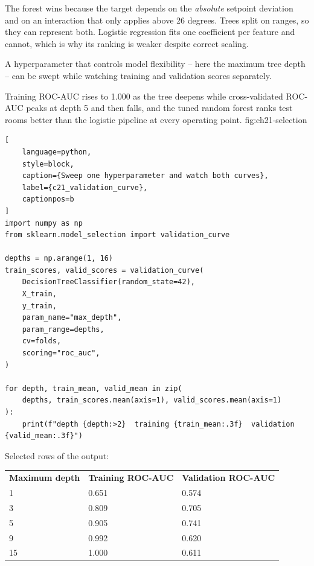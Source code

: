 The forest wins because the target depends on the \emph{absolute} setpoint
deviation and on an interaction that only applies above 26 degrees. Trees split
on ranges, so they can represent both. Logistic regression fits one coefficient
per feature and cannot, which is why its ranking is weaker despite correct
scaling.


A hyperparameter that controls model flexibility -- here the maximum tree depth
-- can be swept while watching training and validation scores separately.

{Training ROC-AUC rises to 1.000 as the tree deepens while cross-validated ROC-AUC peaks at depth 5 and then falls, and the tuned random forest ranks test rooms better than the logistic pipeline at every operating point.}
{fig:ch21-selection}

\begin{lstlisting}[
    language=python,
    style=block,
    caption={Sweep one hyperparameter and watch both curves},
    label={c21_validation_curve},
    captionpos=b
]
import numpy as np
from sklearn.model_selection import validation_curve

depths = np.arange(1, 16)
train_scores, valid_scores = validation_curve(
    DecisionTreeClassifier(random_state=42),
    X_train,
    y_train,
    param_name="max_depth",
    param_range=depths,
    cv=folds,
    scoring="roc_auc",
)

for depth, train_mean, valid_mean in zip(
    depths, train_scores.mean(axis=1), valid_scores.mean(axis=1)
):
    print(f"depth {depth:>2}  training {train_mean:.3f}  validation {valid_mean:.3f}")
\end{lstlisting}

Selected rows of the output:

\begin{center}
\begin{tabular}{lll}
\textbf{Maximum depth} & \textbf{Training ROC-AUC} & \textbf{Validation ROC-AUC} \\
1 & 0.651 & 0.574 \\
3 & 0.809 & 0.705 \\
5 & 0.905 & 0.741 \\
9 & 0.992 & 0.620 \\
15 & 1.000 & 0.611 \\
\end{tabular}
\end{center}

